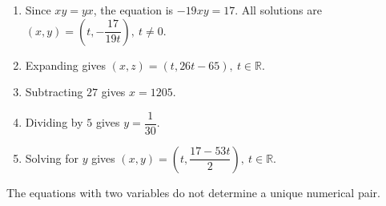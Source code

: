 \begin{enumerate}
\item Since $xy=yx$, the equation is $-19xy=17$. All solutions are $\boxed{(x,y)=\left(t,-\dfrac{17}{19t}\right),\ t\ne0}$.
\item Expanding gives $\boxed{(x,z)=(t,26t-65),\ t\in\mathbb R}$.
\item Subtracting $27$ gives $\boxed{x=1205}$.
\item Dividing by $5$ gives $\boxed{y=\dfrac{1}{30}}$.
\item Solving for $y$ gives $\boxed{(x,y)=\left(t,\dfrac{17-53t}{2}\right),\ t\in\mathbb R}$.
\end{enumerate}
The equations with two variables do not determine a unique numerical pair.
